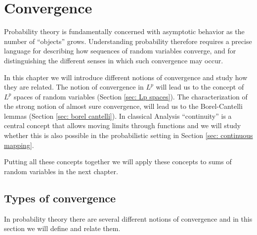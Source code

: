 \chapter{Convergence}


Probability theory is fundamentally concerned with asymptotic behavior as
the number of ``objects'' grows. Understanding probability therefore requires a
precise language for describing how sequences of random variables converge, and
for distinguishing the different senses in which such convergence may occur.

In this chapter we will introduce different notions of convergence and study how
they are related. The notion of convergence in \(L^p\) will lead us to the concept
of \(L^p\) spaces of random variables (Section \ref{sec: Lp spaces}). The
characterization of the strong notion of almost sure convergence, will lead us
to the Borel-Cantelli lemmas (Section \ref{sec: borel cantelli}).
In classical Analysis ``continuity'' is a central concept that allows
moving limits through functions and we will study whether this is also possible
in the probabilistic setting in Section \ref{sec: continuous mapping}.

Putting all these concepts together we will apply these concepts to
sums of random variables in the next chapter.

\section{Types of convergence}

In probability theory there are several different notions of convergence and in
this section we will define and relate them.

